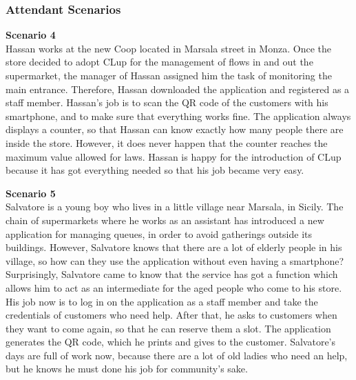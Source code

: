 \documentclass[table, 12pt]{article}
\begin{document}
\begin{minipage}{\textwidth}
    \subsubsection{Attendant Scenarios}
    \textbf{Scenario 4}\\
    Hassan works at the new Coop located in Marsala street in Monza. Once the store decided to adopt CLup for the management of flows in and out the supermarket, the manager of Hassan assigned him the task of monitoring the main entrance. Therefore, Hassan downloaded the application and registered as a staff member. Hassan's job is to scan the QR code of the customers with his smartphone, and to make sure that everything works fine. The application always displays a counter, so that Hassan can know exactly how many people there are inside the store. However, it does never happen that the counter reaches the maximum value allowed for laws. Hassan is happy for the introduction of CLup because it has got everything needed so that his job became very easy.\\
\end{minipage}

\begin{minipage}{\textwidth}
    \textbf{Scenario 5}\\
    Salvatore is a young boy who lives in a little village near Marsala, in Sicily. The chain of supermarkets where he works as an assistant has introduced a new application for managing queues, in order to avoid gatherings outside its buildings. However, Salvatore knows that there are a lot of elderly people in his village, so how can they use the application without even having a smartphone? Surprisingly, Salvatore came to know that the service has got a function which allows him to act as an intermediate for the aged people who come to his store. His job now is to log in on the application as a staff member and take the credentials of customers who need help. After that, he asks to customers when they want to come again, so that he can reserve them a slot. The application generates the QR code, which he prints and gives to the customer. Salvatore's days are full of work now, because there are a lot of old ladies who need an help, but he knows he must done his job for community's sake.\\

\end{minipage}
\end{document}
